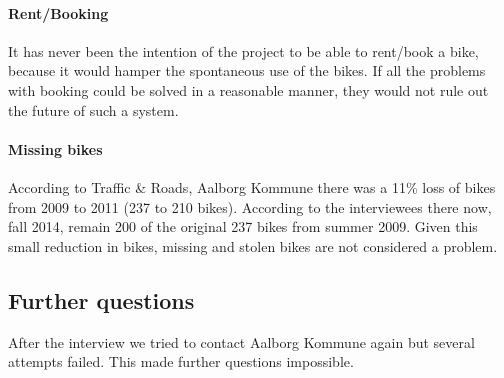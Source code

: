 \paragraph{Rent/Booking}
It has never been the intention of the project to be able to rent/book a bike, because it would hamper the spontaneous use of the bikes.
If all the problems with booking could be solved in a reasonable manner, they would not rule out the future of such a system.


\paragraph{Missing bikes}
According to Traffic \& Roads, Aalborg Kommune\cite{cykelplanlaegning} there was a 11\% loss of bikes from 2009 to 2011 (237 to 210 bikes).
According to the interviewees there now, fall 2014, remain 200 of the original 237 bikes from summer 2009. 
Given this small reduction in bikes, missing and stolen bikes are not considered a problem.

\subsection{Further questions}
After the interview we tried to contact Aalborg Kommune again but several attempts failed.
This made further questions impossible. 